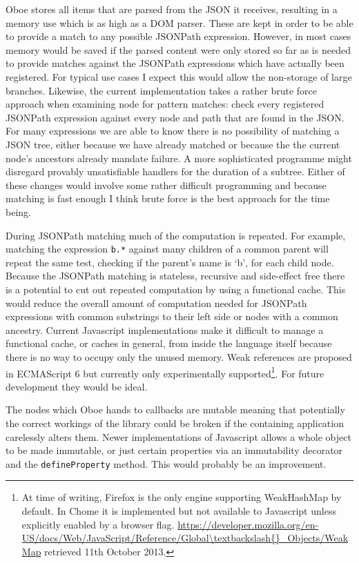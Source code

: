 \documentclass[]{article}
\begin{document}
Oboe stores all items that are parsed from the JSON it receives,
resulting in a memory use which is as high as a DOM parser. These are
kept in order to be able to provide a match to any possible JSONPath
expression. However, in most cases memory would be saved if the parsed
content were only stored so far as is needed to provide matches against
the JSONPath expressions which have actually been registered. For
typical use cases I expect this would allow the non-storage of large
branches. Likewise, the current implementation takes a rather brute
force approach when examining node for pattern matches: check every
registered JSONPath expression against every node and path that are
found in the JSON. For many expressions we are able to know there is no
possibility of matching a JSON tree, either because we have already
matched or because the the current node's ancestors already mandate
failure. A more sophisticated programme might disregard provably
unsatisfiable handlers for the duration of a subtree. Either of these
changes would involve some rather difficult programming and because
matching is fast enough I think brute force is the best approach for the
time being.

During JSONPath matching much of the computation is repeated. For
example, matching the expression \texttt{b.*} against many children of a
common parent will repeat the same test, checking if the parent's name
is `b', for each child node. Because the JSONPath matching is stateless,
recursive and side-effect free there is a potential to cut out repeated
computation by using a functional cache. This would reduce the overall
amount of computation needed for JSONPath expressions with common
substrings to their left side or nodes with a common ancestry. Current
Javascript implementations make it difficult to manage a functional
cache, or caches in general, from inside the language itself because
there is no way to occupy only the unused memory. Weak references are
proposed in ECMAScript 6 but currently only experimentally
supported\footnote{At time of writing, Firefox is the only engine
  supporting WeakHashMap by default. In Chome it is implemented but not
  available to Javascript unless explicitly enabled by a browser flag.
  \url{https://developer.mozilla.org/en-US/docs/Web/JavaScript/Reference/Global\textbackslash{}_Objects/WeakMap}
  retrieved 11th October 2013.}. For future development they would be
ideal.

The nodes which Oboe hands to callbacks are mutable meaning that
potentially the correct workings of the library could be broken if the
containing application carelessly alters them. Newer implementations of
Javascript allows a whole object to be made immutable, or just certain
properties via an immutability decorator and the \texttt{defineProperty}
method. This would probably be an improvement.
\end{document}
